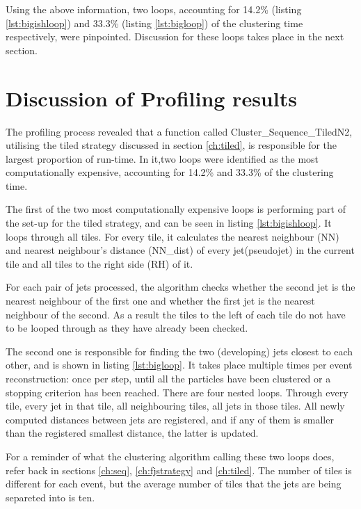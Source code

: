 Using the above information, two loops, accounting for 14.2\% (listing \ref{lst:bigishloop}) and 33.3\% (listing \ref{lst:bigloop}) of the clustering time respectively, were pinpointed. Discussion for these loops takes place in the next section.


\section{Discussion of Profiling results}\label{ch:proftalk}
The profiling process revealed that a function called Cluster\_Sequence\_TiledN2, utilising the tiled strategy discussed in section \ref{ch:tiled}, is responsible for the largest proportion of run-time. In it,two loops were identified as the most computationally expensive, accounting for 14.2\% and 33.3\% of the clustering time.

The first of the two most computationally expensive loops is performing part of the set-up for the tiled strategy, and can be seen in listing \ref{lst:bigishloop}.  It loops through all tiles. For every tile, it calculates the nearest neighbour (NN) and nearest neighbour's distance (NN\_dist) of every jet(pseudojet) in the current tile and all tiles to the right side (RH) of it. 

 For each pair of jets processed, the algorithm checks whether the second jet is the nearest neighbour of the first one and whether the first jet is the nearest neighbour of the second. As a result the tiles to the left of each tile do not have to be looped through as they have already been checked.

The second one is responsible for finding the two (developing) jets closest to each other, and is shown in listing \ref{lst:bigloop}. It takes place multiple times per event reconstruction: once per step, until all the particles have been clustered or a stopping criterion has been reached. There are four nested loops. Through every tile, every jet in that tile, all neighbouring tiles, all jets in those tiles. All newly computed distances between jets are registered, and if any of them is smaller than the registered smallest distance, the latter is updated.

For a reminder of what the clustering algorithm calling these two loops does, refer back in sections \ref{ch:seq}, \ref{ch:fjstrategy} and \ref{ch:tiled}. The number of tiles is different for each event, but the average number of tiles that the jets are being separeted into is ten.



